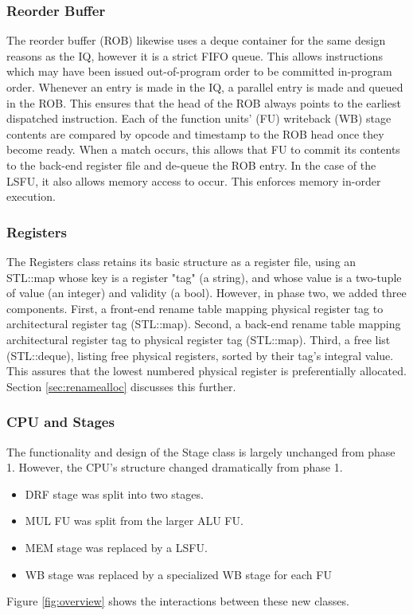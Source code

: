\documentclass[12pt]{article}
\begin{document}
\subsubsection{Reorder Buffer}
\label{sec:rob}
The reorder buffer (ROB) likewise uses a deque container for the same design reasons as the IQ, however it is a strict FIFO queue. 
This allows instructions which may have been issued out-of-program order to be committed in-program order. 
Whenever an entry is made in the IQ, a parallel entry is made and queued in the ROB. 
This ensures that the head of the ROB always points to the earliest dispatched instruction. 
Each of the function units' (FU) writeback (WB) stage contents are compared by opcode and timestamp to the ROB head once they become ready. 
When a match occurs, this allows that FU to commit its contents to the back-end register file and de-queue the ROB entry. 
In the case of the LSFU, it also allows memory access to occur.
This enforces memory in-order execution.

\subsubsection{Registers}
The Registers class retains its basic structure as a register file, using an STL::map whose key is a register "tag" (a string), and whose value is a two-tuple of value (an integer) and validity (a bool).
However, in phase two, we added three components.
First, a front-end rename table mapping physical register tag to architectural register tag (STL::map).
Second, a back-end rename table mapping architectural register tag to physical register tag (STL::map).
Third, a free list (STL::deque), listing free physical registers, sorted by their tag's integral value.
This assures that the lowest numbered physical register is preferentially allocated. Section \ref{sec:renamealloc} discusses this further.

\subsubsection{CPU and Stages}
The functionality and design of the Stage class is largely unchanged from phase 1. 
However, the CPU's structure changed dramatically from phase 1.
\begin{itemize}
  \item DRF stage was split into two stages.
  \item MUL FU was split from the larger ALU FU.
  \item MEM stage was replaced by a LSFU.
  \item WB stage was replaced by a specialized WB stage for each FU
\end{itemize}
Figure \ref{fig:overview} shows the interactions between these new classes.
\end{document}
